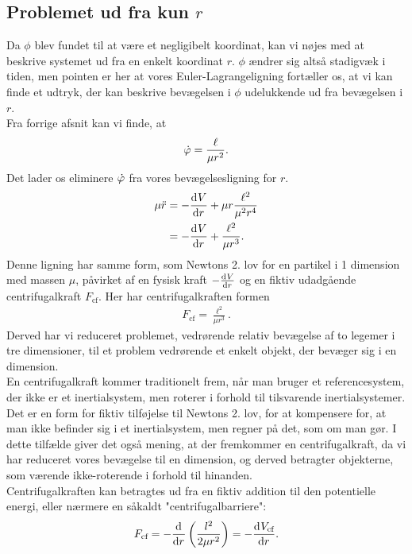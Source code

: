 \subsection{Problemet ud fra kun $r$}
Da $\phi$ blev fundet til at være et negligibelt koordinat, kan vi nøjes med at beskrive systemet ud fra en enkelt koordinat $r$. $\phi$ ændrer sig altså stadigvæk i tiden, men pointen er her at vores Euler-Lagrangeligning fortæller os, at vi kan finde et udtryk, der kan beskrive bevægelsen i $\phi$ udelukkende ud fra bevægelsen i $r$. \\
%
Fra forrige afsnit kan vi finde, at
\begin{align}
	\dt{\phi} = \frac{\ell }{\mu r^2}.
\end{align}
Det lader os eliminere $\dt{\phi}$ fra vores bevægelsesligning for $r$.
\begin{equation}
\begin{aligned}
	\mu \ddt{r} &= -\dif{r}{V} + \mu r \frac{\ell  ^2}{\mu ^2 r^4} \\
	&= -\dif{r}{V} + \frac{\ell  ^2}{\mu r^3}.
\end{aligned}
\end{equation}
Denne ligning har samme form, som Newtons 2. lov for en partikel i 1 dimension med massen $\mu$, påvirket af en fysisk kraft $-\dif{r}{V}$ og en fiktiv udadgående centrifugalkraft $F_\text{cf}$. Her har centrifugalkraften formen
\begin{align}
	F_\text{cf} = \frac{\ell  ^2}{\mu r^3}.
\end{align}
Derved har vi reduceret problemet, vedrørende relativ bevægelse af to legemer i tre dimensioner, til et problem vedrørende et enkelt objekt, der bevæger sig i en dimension. \\
%
En centrifugalkraft kommer traditionelt frem, når man bruger et referencesystem, der ikke er et inertialsystem, men roterer i forhold til tilsvarende inertialsystemer. Det er en form for fiktiv tilføjelse til Newtons 2. lov, for at kompensere for, at man ikke befinder sig i et inertialsystem, men regner på det, som om man gør. I dette tilfælde giver det også mening, at der fremkommer en centrifugalkraft, da vi har reduceret vores bevægelse til en dimension, og derved betragter objekterne, som værende ikke-roterende i forhold til hinanden. \\
%
Centrifugalkraften kan betragtes ud fra en fiktiv addition til den potentielle energi, eller nærmere en såkaldt "centrifugalbarriere":
\begin{align}
	F_\text{cf} = - \dif{r}{} \left(\frac{l^2}{2\mu r^2}\right) = - \dif{r}{V_\text{cf}}.
\end{align}
